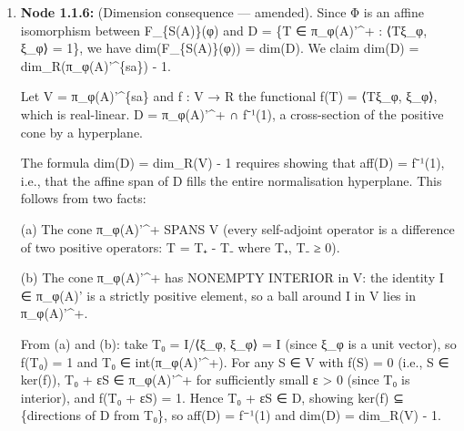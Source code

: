 \documentclass{article}
\begin{document}
\begin{enumerate}
\begin{enumerate}
Proof: Let ψ ∈ F\_\{S(A)\}(φ). By the face characterisation (proved in Node 1.1.3): ψ ∈ F\_\{S(A)\}(φ) iff ψ ≤ λφ for some λ > 0. Specifically, φ = tψ + (1-t)σ for some t ∈ (0,1), giving ψ ≤ (1/t)φ with λ = 1/t.

By the Radon-Nikodym theorem for states (Alfsen-Shultz 2001, Proposition 5.31; Takesaki I.9): given ψ ≤ λφ, there exists a unique T ∈ π\_φ(A)' with 0 ≤ T ≤ λI such that ψ(a) = ⟨π\_φ(a)Tξ\_φ, ξ\_φ⟩ for all a ∈ A. This result is established for C*-algebras (where GNS gives bounded representations) and extends to *-algebras with Archimedean conditions (where GNS is also bounded, per Node 1.3.1).

Since ψ is a state: ψ(1) = 1 = ⟨Tξ\_φ, ξ\_φ⟩. Hence T is in the domain of Φ and Φ(T) = ψ.

This is a direct proof depending on Node 1.1.3 (face characterisation), the Radon-Nikodym theorem for states (external reference), and Node 1.3.1 (scope: GNS gives bounded representations).

  Type: claim, Inference: assumption, Status: pending, Taint: unresolved

\item \textbf{Node 1.1.6:} (Dimension consequence — amended). Since Φ is an affine isomorphism between F\_\{S(A)\}(φ) and D = \{T ∈ π\_φ(A)'\textasciicircum{}+ : ⟨Tξ\_φ, ξ\_φ⟩ = 1\}, we have dim(F\_\{S(A)\}(φ)) = dim(D). We claim dim(D) = dim\_R(π\_φ(A)'\textasciicircum{}\{sa\}) - 1.

Let V = π\_φ(A)'\textasciicircum{}\{sa\} and f : V → R the functional f(T) = ⟨Tξ\_φ, ξ\_φ⟩, which is real-linear. D = π\_φ(A)'\textasciicircum{}+ ∩ f⁻¹(1), a cross-section of the positive cone by a hyperplane.

The formula dim(D) = dim\_R(V) - 1 requires showing that aff(D) = f⁻¹(1), i.e., that the affine span of D fills the entire normalisation hyperplane. This follows from two facts:

(a) The cone π\_φ(A)'\textasciicircum{}+ SPANS V (every self-adjoint operator is a difference of two positive operators: T = T₊ - T₋ where T₊, T₋ ≥ 0).

(b) The cone π\_φ(A)'\textasciicircum{}+ has NONEMPTY INTERIOR in V: the identity I ∈ π\_φ(A)' is a strictly positive element, so a ball around I in V lies in π\_φ(A)'\textasciicircum{}+.

From (a) and (b): take T₀ = I/⟨ξ\_φ, ξ\_φ⟩ = I (since ξ\_φ is a unit vector), so f(T₀) = 1 and T₀ ∈ int(π\_φ(A)'\textasciicircum{}+). For any S ∈ V with f(S) = 0 (i.e., S ∈ ker(f)), T₀ + εS ∈ π\_φ(A)'\textasciicircum{}+ for sufficiently small ε > 0 (since T₀ is interior), and f(T₀ + εS) = 1. Hence T₀ + εS ∈ D, showing ker(f) ⊆ \{directions of D from T₀\}, so aff(D) = f⁻¹(1) and dim(D) = dim\_R(V) - 1.


\end{enumerate}
\end{enumerate}
\end{document}
